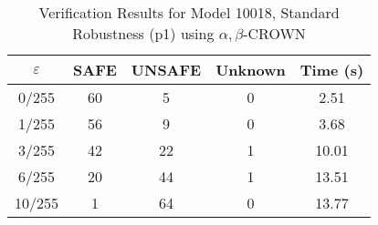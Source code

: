 \begin{table}[htbp]
\centering
\caption{Verification Results for Model 10018, Standard Robustness (p1) using $\alpha,\beta$-CROWN}
\label{tab:model10018_p1_abcrown}
\begin{tabular}{|c|c|c|c|c|}
\hline
$\varepsilon$ & SAFE & UNSAFE & Unknown & Time (s) \\ \hline
0/255 & 60 & 5 & 0 & 2.51 \\ \hline
1/255 & 56 & 9 & 0 & 3.68 \\ \hline
3/255 & 42 & 22 & 1 & 10.01 \\ \hline
6/255 & 20 & 44 & 1 & 13.51 \\ \hline
10/255 & 1 & 64 & 0 & 13.77 \\ \hline
\end{tabular}
\end{table}
